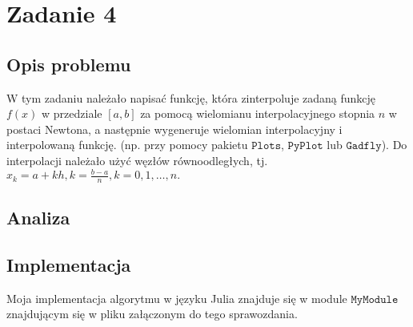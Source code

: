 \section{Zadanie 4}
\subsection{Opis problemu}
W tym zadaniu należało napisać funkcję, która zinterpoluje zadaną funkcję $f(x)$ w przedziale $[a, b]$ za pomocą wielomianu interpolacyjnego stopnia $n$ w postaci Newtona, a następnie wygeneruje wielomian interpolacyjny i interpolowaną funkcję. (np. przy pomocy pakietu $\mathtt{Plots}$, $\mathtt{PyPlot}$ lub $\mathtt{Gadfly}$). Do interpolacji należało użyć węzłów równoodległych, tj. $x_k = a + kh, k = \frac{b - a}{n}, k = 0, 1, \ldots,  n.$
\subsection{Analiza}
\subsection{Implementacja}
Moja implementacja algorytmu w języku Julia znajduje się w module $ \texttt{MyModule} $ znajdującym się w pliku załączonym do tego sprawozdania.